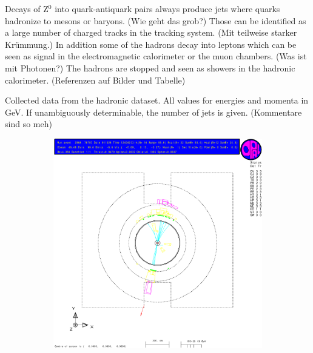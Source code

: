 \documentclass[11pt, a4paper]{article}
\numberwithin{equation}{section}
\newcommand{\korr}[1]{{\color{red}(#1)}}
\begin{document}
Decays of Z$^0$ into quark-antiquark pairs always produce jets where quarks hadronize to mesons or baryons. \korr{Wie geht das grob?}
Those can be identified as a large number of charged tracks in the tracking system. \korr{Mit teilweise starker Krümmung.}
In addition some of the hadrons decay into leptons which can be seen as signal in the electromagnetic calorimeter or the muon chambers. \korr{Was ist mit Photonen?}
The hadrons are stopped and seen as showers in the hadronic calorimeter.
\korr{Referenzen auf Bilder und Tabelle}
\begin{table}
	\centering
	
	\caption{Collected data from the hadronic dataset. All values for energies and momenta in \si{GeV}. If unambiguously determinable, the number of jets is given. \korr{Kommentare sind so meh}}
\end{table}
\begin{figure}[h]
	\centering
	\begin{subfigure}{\textwidth}
		\centering
		\includegraphics[width=.9\textwidth]{./data/tag1/qq_pics/cropped/qq_04}
	\end{subfigure}
\end{figure}
\end{document}
